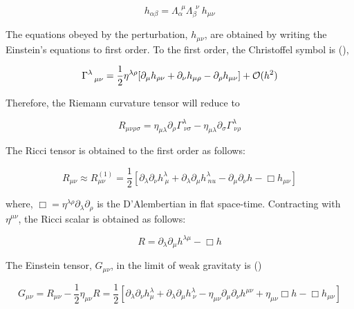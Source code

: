 \documentclass[epsf]{article}
\begin{document}
\begin{equation}
h_{\alpha\beta} = \Lambda_{\alpha}^{~~\mu} \Lambda_{\beta}^{~~\nu} ~h_{\mu\nu}
\end{equation}

The equations obeyed by the perturbation, $h_{\mu\nu}$, are obtained by
writing the Einstein's equations to first order. To the first order, the 
Christoffel symbol is (\cite{schutz,maggiore}),

\begin{equation}
\Gamma^{\lambda}_{~~\mu\nu} = \frac{1}{2} \eta^{\lambda\rho}[\partial_{\mu}
h_{\rho\nu} + \partial_{\nu}h_{\mu\rho} - \partial_{\rho}h_{\mu\nu}] + 
{\cal{O}}(h^2)
\end{equation} 

Therefore, the Riemann curvature tensor will reduce to

\begin{equation}
R_{\mu\nu\rho\sigma} = \eta_{\mu\lambda}\partial_{\rho}\Gamma^{\lambda}_{~\nu\sigma} - \eta_{\mu\lambda}\partial_{\sigma}\Gamma^{\lambda}_{~\nu\rho}
\end{equation}

The Ricci tensor is obtained to the first order as follows:

\begin{equation}
R_{\mu\nu} \approx R^{(1)}_{\mu\nu} = \frac{1}{2}\left[\partial_{\lambda}\partial_{\nu}h^{\lambda}_{~\mu} + \partial_{\lambda}\partial_{\mu}h^{\lambda}_{~nu} - \partial_{\mu}\partial_{\nu}h - \Box h_{\mu\nu}\right]
\end{equation}

where, $\Box = \eta^{\lambda\rho}\partial_{\lambda}\partial_{\rho}$ is 
the D'Alembertian in flat space-time. Contracting with $\eta^{\mu\nu}$,
the Ricci scalar is obtained as follows:

\begin{equation}
R = \partial_{\lambda}\partial_{\mu} h^{\lambda\mu} - \Box h
\end{equation}

The Einstein tensor, $G_{\mu\nu}$, in the limit of weak gravitaty is  (\cite{schutz,maggiore})

\begin{equation}
G_{\mu\nu} = R_{\mu\nu} - \frac{1}{2} \eta_{\mu\nu} R = \frac{1}{2}[\partial_{\lambda}\partial_{\nu}h^{\lambda}_{\mu} + \partial_{\lambda}\partial_{\mu}h^{\lambda}_{~\nu} - \eta_{\mu\nu}\partial_{\mu}\partial_{\nu}h^{\mu\nu} + \eta_{\mu\nu}\Box h - \Box h_{\mu\nu}]
\end{equation}
\end{document}
